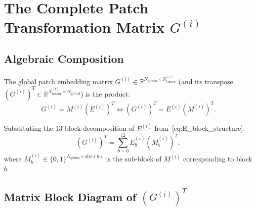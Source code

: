 \documentclass[11pt,a4paper]{article}
\newcommand{\R}{\mathbb{R}}
\begin{document}
\newpage
\section{The Complete Patch Transformation Matrix \texorpdfstring{$G^{(i)}$}{G(i)}}

\subsection{Algebraic Composition}
The global patch embedding matrix $G^{(i)} \in \R^{N_{\text{global}} \times N_{\text{tensor}}^{(i)}}$ (and its transpose $(G^{(i)})^T \in \R^{N_{\text{tensor}}^{(i)} \times N_{\text{global}}}$) is the product:
\begin{equation} \label{eq:G_i_product}
    G^{(i)} = M^{(i)} (E^{(i)})^T \iff (G^{(i)})^T = E^{(i)} (M^{(i)})^T.
\end{equation}

Substituting the 13-block decomposition of $E^{(i)}$ from~\eqref{eq:E_block_structure}:
\begin{equation}
    (G^{(i)})^T = \sum_{b=0}^{12} E_b^{(i)} (M_b^{(i)})^T,
\end{equation}
where $M_b^{(i)} \in \{0, 1\}^{N_{\text{global}} \times \text{size}(b)}$ is the sub-block of $M^{(i)}$ corresponding to block $b$.

\subsection{Matrix Block Diagram of \texorpdfstring{$(G^{(i)})^T$}{G(i)\string^T}}
\end{document}
